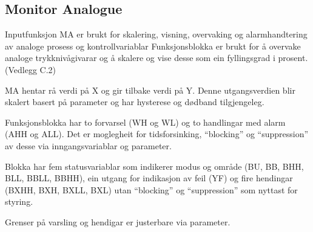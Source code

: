 \newpage

\subsection{Monitor Analogue}
Inputfunksjon \gls{MA} er brukt for skalering, visning, overvaking og alarmhandtering av
analoge prosess og kontrollvariablar \citep{IEC-63131}
Funksjonsblokka er brukt for å overvake analoge trykknivågivarar 
og å skalere og vise desse som ein fyllingsgrad i prosent. (Vedlegg C.2)

MA hentar rå verdi på X og gir tilbake verdi på Y.
Denne utgangsverdien blir skalert basert på parameter og har hysterese og dødband tilgjengeleg.

Funksjonsblokka har to forvarsel (WH og WL) og to handlingar med alarm (AHH og ALL).
Det er moglegheit for tidsforsinking, ``blocking'' og ``suppression'' av desse via inngangsvariablar og parameter.

Blokka har fem statusvariablar som indikerer modus og område (BU, BB, BHH, BLL, BBLL, BBHH), ein utgang for indikasjon av feil (YF)
og fire hendingar (BXHH, BXH, BXLL, BXL) utan ``blocking'' og ``suppression'' som nyttast for styring.

Grenser på varsling og hendigar er justerbare via parameter.

